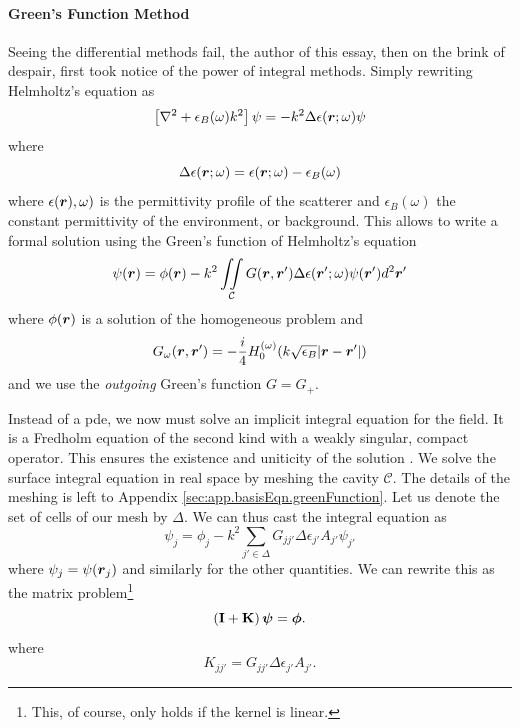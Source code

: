 \paragraph{Green's Function Method}
Seeing the differential methods fail, the author of this essay, 
then on the brink of despair, first took notice of the 
power of integral methods. Simply rewriting Helmholtz's 
equation as
  \begin{equation}
   \left[\nabla^2+\epsilon_B(\omega)k^2\right]\psi=-k^2\Delta\epsilon(\boldsymbol{r};\omega)\psi
  \end{equation}
where 
  \begin{equation}
  \Delta\epsilon(\boldsymbol{r};\omega)=\epsilon(\boldsymbol{r};\omega)-\epsilon_B(\omega)
  \end{equation}
where $\epsilon(\boldsymbol{r}),\omega)$ is the permittivity profile of the scatterer
and $\epsilon_B(\omega)$ the constant permittivity of the environment, or background.
This allows to write a formal solution using the Green's function of Helmholtz's equation
  \begin{equation}
   \psi(\boldsymbol{r}) = \phi(\boldsymbol{r}) - k^2\mathop{\iint}_\mathcal{C}G(\boldsymbol{r},\boldsymbol{r}')\Delta\epsilon(\boldsymbol{r}';\omega)\psi(\boldsymbol{r}')d^2\boldsymbol{r}'
  \end{equation}
where $\phi(\boldsymbol{r})$ is a solution of the homogeneous problem and
  \begin{equation}
   G_\omega(\boldsymbol{r},\boldsymbol{r}') = -\frac{i}{4}H_0^{(\omega)}(k\sqrt{\epsilon_B}|\boldsymbol{r}-\boldsymbol{r}'|)
  \end{equation}
and we use the \textit{outgoing} Green's function $G=G_+$.

Instead of a \gls{pde}, we now must solve an implicit 
integral equation for the field. It is a Fredholm 
equation of the second kind with a weakly singular, compact
operator. This ensures the existence
and uniticity of the solution \cite{GOH1981,COL2013}.
We solve the surface integral equation in real space by meshing
the cavity $\mathcal{C}$. The details of the meshing is left to 
Appendix \ref{sec:app.basisEqn.greenFunction}. Let us denote the set
of cells of our mesh by $\Delta$. We can thus cast the integral
equation as
	\begin{equation}
		\psi_j = \phi_j -k^2\sum_{j'\in\Delta} G_{jj'}\Delta\epsilon_{j'}A_{j'}\psi_{j'}
	\end{equation}
where $\psi_j=\psi(\boldsymbol{r}_j)$ and similarly for the other quantities. We can
rewrite this as the matrix problem\footnote{This, of course, only holds if the
kernel is linear.} 
	\begin{equation}
		\left(\mathbf{I}+\mathbf{K}\right)\boldsymbol{\psi}=\boldsymbol{\phi}.
	\end{equation}
where 
	\begin{equation}
		K_{jj'} = G_{jj'}\Delta\epsilon_{j'}A_{j'}.
	\end{equation}

